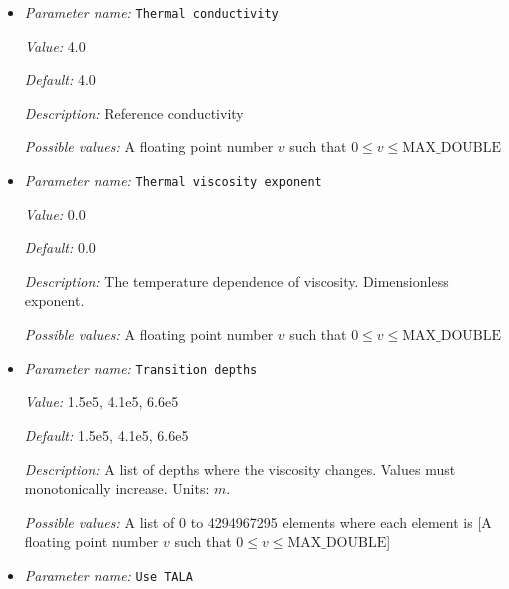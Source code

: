\begin{itemize}
\item {\it Parameter name:} {\tt Thermal conductivity}
\label{parameters:Material model/Ascii reference profile/Thermal conductivity}
\label{parameters:Material_20model/Ascii_20reference_20profile/Thermal_20conductivity}


{\it Value:} 4.0


{\it Default:} 4.0


{\it Description:} Reference conductivity


{\it Possible values:} A floating point number $v$ such that $0 \leq v \leq \text{MAX\_DOUBLE}$
\item {\it Parameter name:} {\tt Thermal viscosity exponent}
\label{parameters:Material model/Ascii reference profile/Thermal viscosity exponent}
\label{parameters:Material_20model/Ascii_20reference_20profile/Thermal_20viscosity_20exponent}


{\it Value:} 0.0


{\it Default:} 0.0


{\it Description:} The temperature dependence of viscosity. Dimensionless exponent.


{\it Possible values:} A floating point number $v$ such that $0 \leq v \leq \text{MAX\_DOUBLE}$
\item {\it Parameter name:} {\tt Transition depths}
\label{parameters:Material model/Ascii reference profile/Transition depths}
\label{parameters:Material_20model/Ascii_20reference_20profile/Transition_20depths}


{\it Value:} 1.5e5, 4.1e5, 6.6e5


{\it Default:} 1.5e5, 4.1e5, 6.6e5


{\it Description:} A list of depths where the viscosity changes. Values must monotonically increase. Units: $m$.


{\it Possible values:} A list of 0 to 4294967295 elements where each element is [A floating point number $v$ such that $0 \leq v \leq \text{MAX\_DOUBLE}$]
\item {\it Parameter name:} {\tt Use TALA}
\label{parameters:Material model/Ascii reference profile/Use TALA}
\label{parameters:Material_20model/Ascii_20reference_20profile/Use_20TALA}



\end{itemize}

